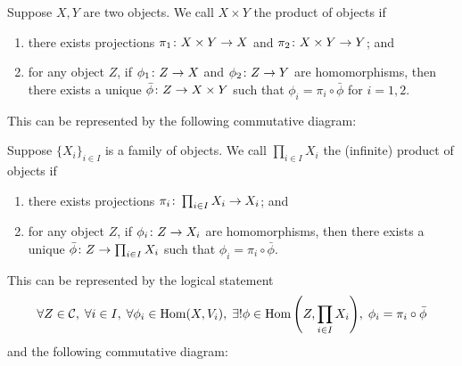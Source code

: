\begin{definition}
    Suppose \(X,Y\) are two objects.
    We call \(X \times Y\) the product of objects if
    \begin{enumerate}[label={(\roman*)}, itemsep=0mm]
        \item there exists projections \(\pi_1\colon X \times Y\to X\)
            and \(\pi_2\colon X \times Y\to Y\); and
        \item for any object \(Z\),
            if \(\phi_1\colon Z\to X\) and \(\phi_2\colon Z\to Y\) are homomorphisms,
            then there exists a unique \(\bar{\phi}\colon Z\to X \times Y\)
            such that \(\phi_i = \pi_i\circ\bar{\phi}\) for \(i = 1,2\).
    \end{enumerate}

    This can be represented by the following commutative diagram:
    \begin{center}
    \end{center}
\end{definition}

\begin{definition}
    Suppose \({\{X_i\}}_{i \in I}\) is a family of objects.
    We call \(\prod_{i \in I} X_i\) the (infinite) product of objects if
    \begin{enumerate}[label={(\roman*)}, itemsep=0mm]
        \item there exists projections \(\pi_i\colon\prod_{i \in I} X_i\to X_i\); and
        \item for any object \(Z\),
            if \(\phi_i\colon Z\to X_i\) are homomorphisms,
            then there exists a unique \(\bar{\phi}\colon Z\to\prod_{i \in I} X_i\)
            such that \(\phi_i = \pi_i\circ\bar{\phi}\).
    \end{enumerate}

    This can be represented by the logical statement
    \begin{equation*}
        \forall Z \in \mca{C},\;
        \forall i \in I,\;
        \forall \phi_i \in \Hom(X,V_i),\;
        \exists! \phi \in \Hom\pqty{Z,\prod_{i \in I} X_i},\;
        \phi_i = \pi_i\circ\bar{\phi}
    \end{equation*}
    and the following commutative diagram:
    \begin{center}
    \end{center}
\end{definition}

